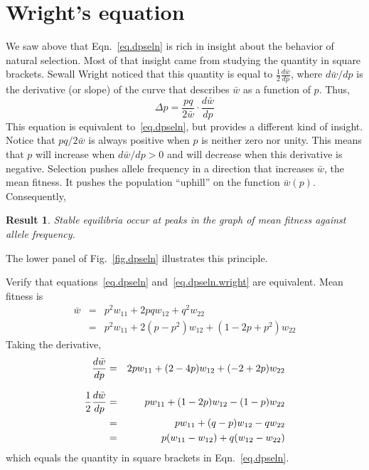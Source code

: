 \documentclass[11pt]{article}
\newtheorem{result}{Result}
\begin{document}

\section{Wright's equation}
We saw above that Eqn.~\ref{eq.dpseln} is rich in insight about the
behavior of natural selection. Most of that insight came from studying
the quantity in square brackets. Sewall Wright \cite{Wright:TGF-69-II}
noticed that this quantity is equal to $\frac{1}{2}\frac{d \bar
  w}{dp}$, where $d \bar w/ dp$ is the derivative (or slope) of the
curve that describes $\bar w$ as a function of $p$. Thus,
\begin{equation}
\Delta p = \frac{pq}{2\bar w}\cdot\frac{d \bar w}{d p}
\label{eq.dpseln.wright}
\end{equation}
This equation is equivalent to~\ref{eq.dpseln}, but provides a
different kind of insight.  Notice that $pq/2\bar w$ is always
positive when $p$ is neither zero nor unity.  This means that $p$ will
increase when $d\bar w/d p > 0$ and will decrease when this derivative
is negative.  Selection pushes allele frequency in a direction that
increases $\bar w$, the mean fitness.  It pushes the population
``uphill'' on the function $\bar w(p)$.  Consequently,
\begin{result}
  Stable equilibria occur at peaks in the graph of mean fitness
  against allele frequency.
\end{result}
The lower panel of Fig.~\ref{fig.dpseln} illustrates this principle.

\begin{exercise}
\label{ex.selection.11}
Verify that equations~\ref{eq.dpseln} and~\ref{eq.dpseln.wright} are
equivalent.
\answer
Mean fitness is
\begin{eqnarray*}
\bar w &=& p^2w_{11}+2pqw_{12}+q^2w_{22}\\
   &=& p^2w_{11}+2(p - p^2)w_{12}+(1 - 2p + p^2)w_{22}
\end{eqnarray*}
Taking the derivative,
\begin{eqnarray*}
  \frac{d\bar w}{dp} &=& 2pw_{11}
  + (2 - 4p)w_{12}
  + (- 2 + 2p)w_{22}\\[0.5\baselineskip]
\frac{1}{2}\frac{d\bar w}{dp} &=& pw_{11}
  + (1 - 2p)w_{12}
  - (1 - p)w_{22}\\
  &=& pw_{11}  + (q - p)w_{12} - qw_{22}\\
  &=& p(w_{11} - w_{12})  + q(w_{12} - w_{22})
\end{eqnarray*}
which equals the quantity in square brackets in Eqn.~\ref{eq.dpseln}.
\end{exercise}
\end{document}
